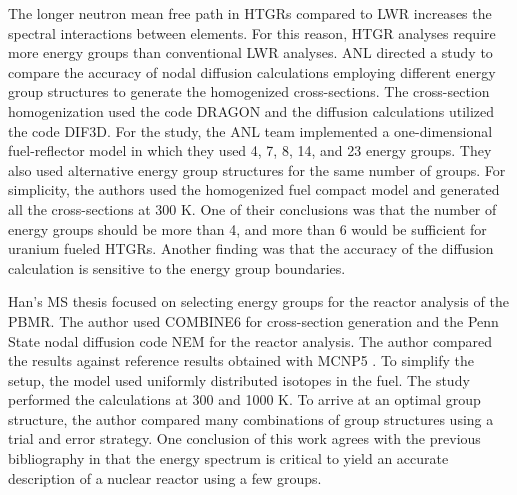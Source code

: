 
The longer neutron mean free path in \glspl{HTGR} compared to \gls{LWR} increases the spectral interactions between elements.
For this reason, \gls{HTGR} analyses require more energy groups than conventional \gls{LWR} analyses.
\gls{ANL} directed a study \cite{lee_status_2006} to compare the accuracy of nodal diffusion calculations employing different energy group structures to generate the homogenized cross-sections.
The cross-section homogenization used the code DRAGON and the diffusion calculations utilized the code DIF3D.
For the study, the ANL team implemented a one-dimensional fuel-reflector model in which they used 4, 7, 8, 14, and 23 energy groups.
They also used alternative energy group structures for the same number of groups.
For simplicity, the authors used the homogenized fuel compact model and generated all the cross-sections at 300 K.
One of their conclusions was that the number of energy groups should be more than 4, and more than 6 would be sufficient for uranium fueled \glspl{HTGR}.
Another finding was that the accuracy of the diffusion calculation is sensitive to the energy group boundaries.

Han's MS thesis \cite{han_sensitivity_2008} focused on selecting energy groups for the reactor analysis of the \gls{PBMR}.
The author used COMBINE6 \cite{grimesey_combinepc-portable_1994} for cross-section generation and the Penn State nodal diffusion code NEM \cite{bandini_three-dimensional_1990} for the reactor analysis.
The author compared the results against reference results obtained with MCNP5 \cite{rsicc_computer_code_collection_mcnp5_2003}.
To simplify the setup, the model used uniformly distributed isotopes in the fuel.
The study performed the calculations at 300 and 1000 K.
To arrive at an optimal group structure, the author compared many combinations of group structures using a trial and error strategy.
One conclusion of this work agrees with the previous bibliography \cite{gulf_oil_company_nuclear_1973} \cite{duderstadt_nuclear_1976} in that the energy spectrum is critical to yield an accurate description of a nuclear reactor using a few groups.

